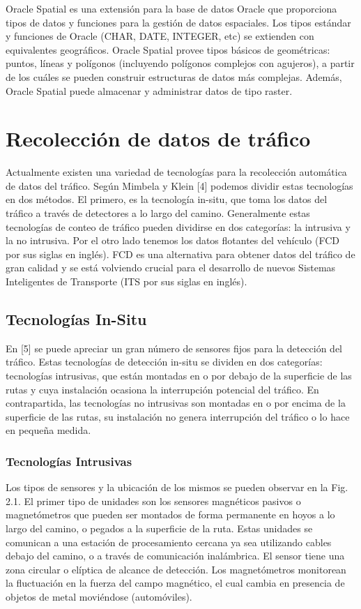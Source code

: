 \documentclass[final,fmstyle]{fpunathesis}
\begin{document}
Oracle Spatial es una extensión para la base de datos Oracle que proporciona tipos de datos y funciones para la gestión de datos espaciales. Los tipos estándar y funciones de Oracle (CHAR, DATE, INTEGER, etc) se extienden con equivalentes geográficos. Oracle Spatial provee tipos básicos de geométricas: puntos, líneas y polígonos (incluyendo polígonos complejos con agujeros), a partir de los cuáles se pueden construir estructuras de datos más complejas. Además, Oracle Spatial puede almacenar y administrar datos de tipo raster.

\chapter{Recolección de datos de tráfico}

Actualmente existen una variedad de tecnologías para la recolección automática de datos del tráfico. Según Mimbela y Klein [4] podemos dividir estas tecnologías en dos métodos. El primero, es la tecnología in-situ, que toma los datos del tráfico a través de detectores a lo largo del camino. Generalmente estas tecnologías de conteo de tráfico pueden dividirse en dos categorías: la intrusiva y la no intrusiva. Por el otro lado tenemos los datos flotantes del vehículo (FCD por sus siglas en inglés). FCD es una alternativa para obtener datos del tráfico de gran calidad y se está volviendo crucial para el desarrollo de nuevos Sistemas Inteligentes de Transporte (ITS por sus siglas en inglés).

\section{Tecnologías In-Situ}

En [5] se puede apreciar un gran número de sensores fijos para la detección del tráfico. Estas tecnologías de detección in-situ se dividen en dos categorías: tecnologías intrusivas, que están montadas en o por debajo de la superficie de las rutas y cuya instalación ocasiona la interrupción potencial del tráfico. En contrapartida, las tecnologías no intrusivas son montadas en o por encima de la superficie de las rutas, su instalación no genera interrupción del tráfico o lo hace en pequeña medida. 

\subsection{Tecnologías Intrusivas}

Los tipos de sensores y la ubicación de los mismos se pueden observar en la Fig. 2.1. El primer tipo de unidades son los sensores magnéticos pasivos o magnetómetros que pueden ser montados de forma permanente en hoyos a lo largo del camino, o pegados a la superficie de la ruta. Estas unidades se comunican a una estación de procesamiento cercana ya sea utilizando cables debajo del camino, o a través de comunicación inalámbrica. El sensor tiene una zona circular o elíptica de alcance de detección. Los magnetómetros monitorean la fluctuación en la fuerza del campo magnético, el cual cambia en presencia de objetos de metal moviéndose (automóviles).
\end{document}
